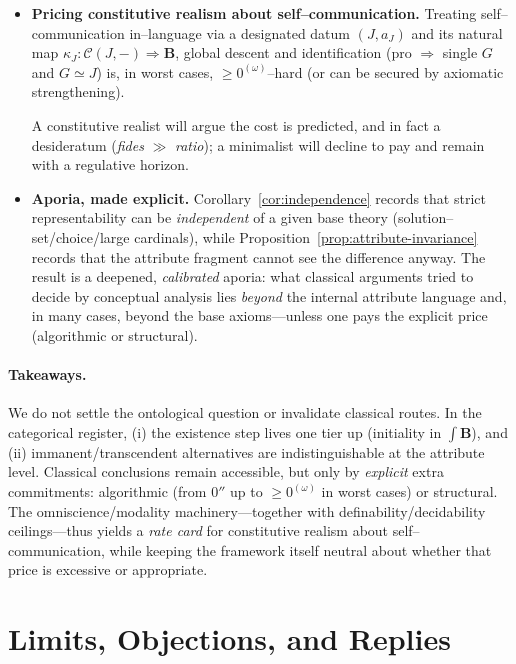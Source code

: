 \documentclass[11pt]{article}
\theoremstyle{upright}
\begin{document}
\begin{itemize}[leftmargin=2em]
\item \textbf{Pricing constitutive realism about self–communication.}
Treating self–communication in–language via a designated datum $(J,a_J)$ and its natural map $\kappa_J:\mathcal C(J,-)\Rightarrow \mathbf B$, global descent and identification (pro $\Rightarrow$ single $G$ and $G\simeq J$) is, in worst cases, $\ge 0^{(\omega)}$–hard (or can be secured by axiomatic strengthening).

A constitutive realist will argue the cost is predicted, and in fact a desideratum (\emph{fides} $\gg$ \emph{ratio}); a minimalist will decline to pay and remain with a regulative horizon.

\item \textbf{Aporia, made explicit.}
Corollary~\ref{cor:independence} records that strict representability can be \emph{independent} of a given base theory (solution–set/choice/large cardinals), while Proposition~\ref{prop:attribute-invariance} records that the attribute fragment cannot see the difference anyway. The result is a deepened, \emph{calibrated} aporia: what classical arguments tried to decide by conceptual analysis lies \emph{beyond} the internal attribute language and, in many cases, beyond the base axioms—unless one pays the explicit price (algorithmic or structural).
\end{itemize}

\paragraph{Takeaways.}
We do not settle the ontological question or invalidate classical routes. In the categorical register, (i) the existence step lives one tier up (initiality in $\int\!\mathbf B$), and (ii) immanent/transcendent alternatives are indistinguishable at the attribute level. Classical conclusions remain accessible, but only by \emph{explicit} extra commitments: algorithmic (from $0''$ up to $\ge 0^{(\omega)}$ in worst cases) or structural. The omniscience/modality machinery—together with definability/decidability ceilings—thus yields a \emph{rate card} for constitutive realism about self–communication, while keeping the framework itself neutral about whether that price is excessive or appropriate.

\section{Limits, Objections, and Replies}\label{sec:limits}
\end{document}
